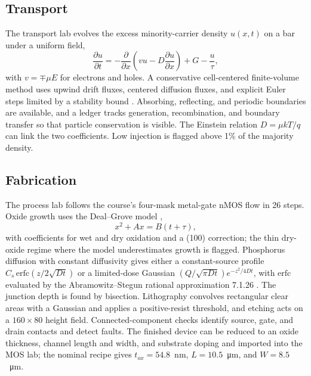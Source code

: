 \documentclass[conference]{IEEEtran}
\begin{document}
\subsection{Transport}
The transport lab evolves the excess minority-carrier density $u(x,t)$ on a bar under a uniform field,
\begin{equation}
\frac{\partial u}{\partial t}=-\frac{\partial}{\partial x}\left(v u - D\frac{\partial u}{\partial x}\right)+G-\frac{u}{\tau},
\end{equation}
with $v=\mp\mu E$ for electrons and holes. A conservative cell-centered finite-volume method uses upwind drift fluxes, centered diffusion fluxes, and explicit Euler steps limited by a stability bound \cite{leveque2002}. Absorbing, reflecting, and periodic boundaries are available, and a ledger tracks generation, recombination, and boundary transfer so that particle conservation is visible. The Einstein relation $D=\mu kT/q$ can link the two coefficients. Low injection is flagged above 1\% of the majority density.

\subsection{Fabrication}
The process lab follows the course's four-mask metal-gate nMOS flow in 26 steps. Oxide growth uses the Deal--Grove model \cite{dealgrove1965},
\begin{equation}
x^2+Ax=B(t+\tau),
\end{equation}
with coefficients for wet and dry oxidation and a (100) correction; the thin dry-oxide regime where the model underestimates growth \cite{massoud1985} is flagged. Phosphorus diffusion with constant diffusivity gives either a constant-source profile $C_s\,\mathrm{erfc}(z/2\sqrt{Dt})$ or a limited-dose Gaussian $(Q/\sqrt{\pi Dt})e^{-z^2/4Dt}$, with $\mathrm{erfc}$ evaluated by the Abramowitz--Stegun rational approximation 7.1.26 \cite{abramowitz1964}. The junction depth is found by bisection. Lithography convolves rectangular clear areas with a Gaussian and applies a positive-resist threshold, and etching acts on a $160\times80$ height field. Connected-component checks identify source, gate, and drain contacts and detect faults. The finished device can be reduced to an oxide thickness, channel length and width, and substrate doping and imported into the MOS lab; the nominal recipe gives $t_{ox}=54.8$~nm, $L=10.5$~\si{\micro\metre}, and $W=8.5$~\si{\micro\metre}.
\end{document}
